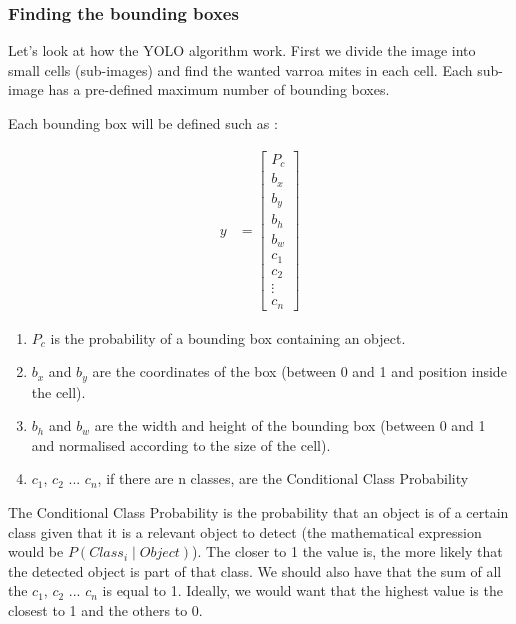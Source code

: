 \documentclass{article}
\begin{document}
\subsubsection{Finding the bounding boxes}

Let's look at how the YOLO algorithm work. First we divide the image into small cells (sub-images) and find the wanted varroa mites in each cell. Each sub-image has a pre-defined maximum number of bounding boxes.

\bigskip

Each bounding box will be defined such as : 

\begin{align}
    y &= \begin{bmatrix}
           P_c \\
           b_x \\
           b_y \\
           b_h \\
           b_w \\
           c_1 \\
           c_2 \\
           \vdots \\
           c_{n}
         \end{bmatrix}
 \end{align}
 
 \begin{enumerate}
     \item $P_c$ is the probability of a bounding box containing an object.
     \item $b_x$ and $b_y$ are the coordinates of the box (between 0 and 1 and position inside the cell).
     \item $b_h$ and $b_w$ are the width and height of the bounding box (between 0 and 1 and normalised according to the size of the cell).
     \item $c_1$, $c_2$ ... $c_n$, if there are n classes, are the Conditional Class Probability
 \end{enumerate}
  The Conditional Class Probability is the probability that an object is of a certain class given that it is a relevant object to detect (the mathematical expression would be $P(Class_i \mid Object)$). The closer to 1 the value is, the more likely that the detected object is part of that class. We should also have that the sum of all the $c_1$, $c_2$ ... $c_n$ is equal to 1. Ideally, we would want that the highest value is the closest to 1 and the others to 0. 
 
 \bigskip
 \bigskip
 
\end{document}
